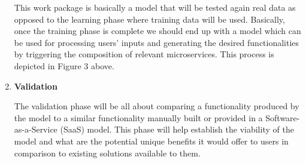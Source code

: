\documentclass{article}
\begin{document}
\begin{enumerate}
This work package is basically a model that will be tested again real data as opposed to the learning phase where training data will be used. Basically, once the training phase is complete we should end up with a model which can be used for processing users’ inputs and generating the desired functionalities by triggering the composition of relevant microservices. This process is depicted in Figure 3 above.


\item \textbf{Validation}


The validation phase will be all about comparing a functionality produced by the model to a similar functionality manually built or provided in a Software-as-a-Service (SaaS) model. This phase will help establish the viability of the model and what are the potential unique benefits it would offer to users in comparison to existing solutions available to them.

\end{enumerate}
\end{document}
